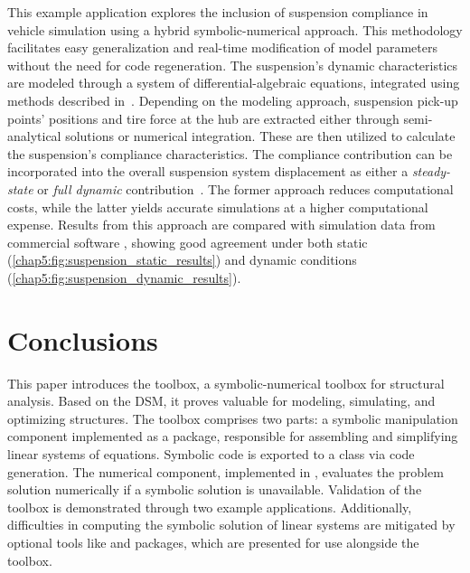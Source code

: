 This example application explores the inclusion of suspension compliance in vehicle simulation using a hybrid symbolic-numerical approach. This methodology facilitates easy generalization and real-time modification of model parameters without the need for code regeneration. The suspension's dynamic characteristics are modeled through a system of differential-algebraic equations, integrated using methods described in~\cite{larcher2024symbolic}. Depending on the modeling approach, suspension pick-up points' positions and tire force at the hub are extracted either through semi-analytical solutions or numerical integration. These are then utilized to calculate the suspension's compliance characteristics. The compliance contribution can be incorporated into the overall suspension system displacement as either a \emph{steady-state} or \emph{full dynamic} contribution~\cite{larcher2024symbolic}. The former approach reduces computational costs, while the latter yields accurate simulations at a higher computational expense. Results from this approach are compared with simulation data from commercial software \Ansys{}, showing good agreement under both static (\figurename{}\ref{chap5:fig:suspension_static_results}) and dynamic conditions (\figurename{}\ref{chap5:fig:suspension_dynamic_results}).


\section{Conclusions}
\label{chap5:sec:conclusion}

This paper introduces the \TrussMe{} toolbox, a symbolic-numerical toolbox for structural analysis. Based on the \ac{DSM}, it proves valuable for modeling, simulating, and optimizing structures. The toolbox comprises two parts: a symbolic manipulation component implemented as a \Maple{} package, responsible for assembling and simplifying linear systems of equations. Symbolic code is exported to a \Matlab{} class via code generation. The numerical component, implemented in \Matlab{}, evaluates the problem solution numerically if a symbolic solution is unavailable. Validation of the \TrussMe{} toolbox is demonstrated through two example applications. Additionally, difficulties in computing the symbolic solution of linear systems are mitigated by optional tools like \LEM{}\cite{lem} and \LAST{}\cite{last} \Maple{} packages, which are presented for use alongside the \TrussMe{} toolbox.

